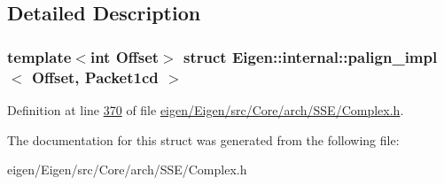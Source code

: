 \subsection{Detailed Description}
\subsubsection*{template$<$int Offset$>$\newline
struct Eigen\+::internal\+::palign\+\_\+impl$<$ Offset, Packet1cd $>$}



Definition at line \hyperlink{eigen_2_eigen_2src_2_core_2arch_2_s_s_e_2_complex_8h_source_l00370}{370} of file \hyperlink{eigen_2_eigen_2src_2_core_2arch_2_s_s_e_2_complex_8h_source}{eigen/\+Eigen/src/\+Core/arch/\+S\+S\+E/\+Complex.\+h}.



The documentation for this struct was generated from the following file\+:\begin{DoxyCompactItemize}
\item 
eigen/\+Eigen/src/\+Core/arch/\+S\+S\+E/\+Complex.\+h\end{DoxyCompactItemize}
